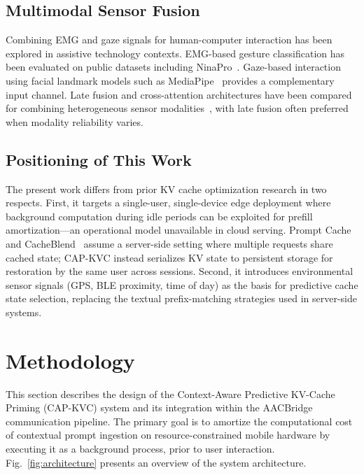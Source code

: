 \documentclass[journal]{IEEEtran}
\begin{document}
\subsection{Multimodal Sensor Fusion}
\label{sec:related_fusion}

Combining EMG and gaze signals for human-computer interaction has been explored in assistive technology contexts. EMG-based gesture classification has been evaluated on public datasets including NinaPro~\cite{ninapro}. Gaze-based interaction using facial landmark models such as MediaPipe~\cite{mediapipe} provides a complementary input channel. Late fusion and cross-attention architectures have been compared for combining heterogeneous sensor modalities~\cite{ngiam2011}, with late fusion often preferred when modality reliability varies.

\subsection{Positioning of This Work}
\label{sec:positioning}

The present work differs from prior KV cache optimization research in two respects. First, it targets a single-user, single-device edge deployment where background computation during idle periods can be exploited for prefill amortization---an operational model unavailable in cloud serving. Prompt Cache~\cite{promptcache} and CacheBlend~\cite{cacheblend} assume a server-side setting where multiple requests share cached state; CAP-KVC instead serializes KV state to persistent storage for restoration by the same user across sessions. Second, it introduces environmental sensor signals (GPS, BLE proximity, time of day) as the basis for predictive cache state selection, replacing the textual prefix-matching strategies used in server-side systems.

\section{Methodology}
\label{sec:methodology}

This section describes the design of the Context-Aware Predictive KV-Cache Priming (CAP-KVC) system and its integration within the AACBridge communication pipeline. The primary goal is to amortize the computational cost of contextual prompt ingestion on resource-constrained mobile hardware by executing it as a background process, prior to user interaction. Fig.~\ref{fig:architecture} presents an overview of the system architecture.
\end{document}
